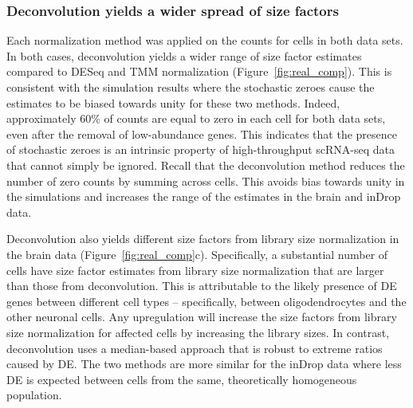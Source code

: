 \documentclass{bmcart}
\def\texttt{[image: ]}
\begin{document}
\subsubsection*{Deconvolution yields a wider spread of size factors}
Each normalization method was applied on the counts for cells in both data sets.
In both cases, deconvolution yields a wider range of size factor estimates compared to DESeq and TMM normalization (Figure~\ref{fig:real_comp}).
This is consistent with the simulation results where the stochastic zeroes cause the estimates to be biased towards unity for these two methods.
Indeed, approximately 60\% of counts are equal to zero in each cell for both data sets, even after the removal of low-abundance genes.
This indicates that the presence of stochastic zeroes is an intrinsic property of high-throughput scRNA-seq data that cannot simply be ignored.
Recall that the deconvolution method reduces the number of zero counts by summing across cells.
This avoids bias towards unity in the simulations and increases the range of the estimates in the brain and inDrop data.


Deconvolution also yields different size factors from library size normalization in the brain data (Figure~\ref{fig:real_comp}c).
Specifically, a substantial number of cells have size factor estimates from library size normalization that are larger than those from deconvolution.
This is attributable to the likely presence of DE genes between different cell types -- specifically, between oligodendrocytes and the other neuronal cells.
Any upregulation will increase the size factors from library size normalization for affected cells by increasing the library sizes.
In contrast, deconvolution uses a median-based approach that is robust to extreme ratios caused by DE.
The two methods are more similar for the inDrop data where less DE is expected between cells from the same, theoretically homogeneous population.
\end{document}
